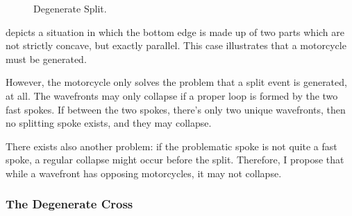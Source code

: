 \documentclass[12pt,a4paper,oneside,openany]{article}
\begin{document}
\begin{figure}[htpb]
\begin{center}
\caption{Degenerate Split.}
\label{fig:parallelnonsplit}
\end{center}
\end{figure}


 depicts a situation in which the bottom edge is made up of two parts which are not strictly concave, but exactly parallel. This case illustrates that a motorcycle must be generated.

However, the motorcycle only solves the problem that a split event is generated, at all. The wavefronts may only collapse if a proper loop is formed by the two fast spokes. If between the two spokes, there's only two unique wavefronts, then no splitting spoke exists, and they may collapse.

There exists also another problem: if the problematic spoke is not quite a fast spoke, a regular collapse might occur before the split. Therefore, I propose that while a wavefront has opposing motorcycles, it may not collapse.

\subsubsection{The Degenerate Cross}
\end{document}
